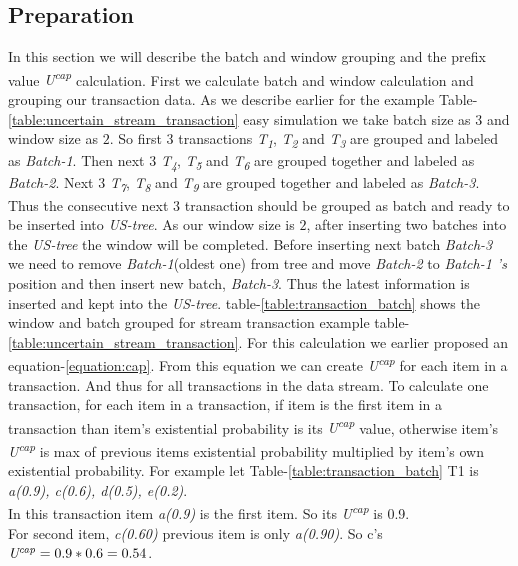     \subsection{Preparation}
    
    In this section we will describe the batch and window grouping and the prefix value \emph{U\textsuperscript{cap}} calculation. First we calculate batch and window calculation and grouping our transaction data. As we describe earlier for the example Table-\ref{table:uncertain_stream_transaction} easy simulation we take batch size as \emph{$3$} and window size as \emph{$2$}. So first \emph{$3$} transactions \emph{T\textsubscript{1}}, \emph{T\textsubscript{2}} and \emph{T\textsubscript{3}} are grouped and labeled as \emph{Batch-1}. Then next \emph{$3$} \emph{T\textsubscript{4}}, \emph{T\textsubscript{5}} and \emph{T\textsubscript{6}} are grouped together and labeled as \emph{Batch-2}. Next \emph{$3$} \emph{T\textsubscript{7}}, \emph{T\textsubscript{8}} and \emph{T\textsubscript{9}} are grouped together and labeled as \emph{Batch-3}. Thus the consecutive next \emph{$3$} transaction should be grouped as batch and ready to be inserted into \emph{US-tree}. As our window size is $2$, after inserting two batches into the \emph{US-tree} the window will be completed. Before inserting next batch \emph{Batch-3} we need to remove \emph{Batch-1}(oldest one) from tree and move \emph{Batch-2} to \emph{Batch-1 's} position and then insert new batch, \emph{Batch-3}. Thus the latest information is inserted and kept into the \emph{US-tree}. table-\ref{table:transaction_batch} shows the window and batch grouped for stream transaction example table-\ref{table:uncertain_stream_transaction}.
    For this calculation we earlier proposed an equation-\ref{equation:cap}. From this equation we can create \emph{U\textsuperscript{cap}} for each item in a transaction. And thus for all transactions in the data stream. To calculate one transaction, for each item in a transaction, if item is the first item in a transaction than item's existential probability is its \emph{U\textsuperscript{cap}} value, otherwise item's \emph{U\textsuperscript{cap}} is max of previous items existential probability multiplied by item's  own existential probability. For example let Table-\ref{table:transaction_batch} T1 is \emph{a(0.9), c(0.6), d(0.5), e(0.2)}. \\
    In this transaction item \emph{a(0.9)} is the first item. So its \emph{U\textsuperscript{cap}} is 0.9.\\
    For second item, \emph{c(0.60)} previous item is only \emph{a(0.90)}. So c's $\emph{U\textsuperscript{cap}} = 0.9*0.6 = 0.54$. \\

